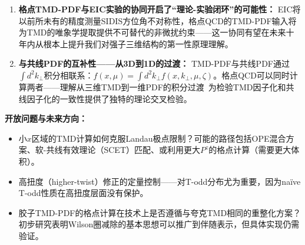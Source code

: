 \documentclass[12pt,a4paper]{ctexart}
\theoremstyle{definition}
\begin{document}
\begin{enumerate}[leftmargin=*]
    \item \textbf{格点TMD-PDF与EIC实验的协同开启了``理论-实验闭环''的可能性：}
    EIC将以前所未有的精度测量SIDIS方位角不对称性，格点QCD的TMD-PDF输入将为TMD的唯象学提取提供不可替代的非微扰约束——这一协同有望在未来十年内从根本上提升我们对强子三维结构的第一性原理理解。

    \item \textbf{与共线PDF的互补性——从3D到1D的过渡：}
    TMD-PDF与共线PDF通过$\int d^2 k_\perp$积分相联系：$f(x, \mu) = \int d^2 k_\perp f(x, k_\perp, \mu, \zeta)$。格点QCD可以同时计算两者——理解从三维TMD到一维PDF的积分过渡~\cite{He2024unpolTMD}为检验TMD因子化和共线因子化的一致性提供了独特的理论交叉检验。

\end{enumerate}

\textbf{开放问题与未来方向：}
\begin{itemize}
    \item 小$x$区域的TMD计算如何克服Landau极点限制？可能的路径包括OPE混合方案、软-共线有效理论（SCET）匹配、或利用更大$P^z$的格点计算（需要更大体积）。
    \item 高扭度（higher-twist）修正的定量控制——对T-odd分布尤为重要，因为na\"ive T-odd性质在高扭度层面没有保护。
    \item 胶子TMD-PDF的格点计算在技术上是否遵循与夸克TMD相同的重整化方案？初步研究表明Wilson圈减除的基本思想可以推广到伴随表示，但具体实现仍需验证。
\end{itemize}
\end{document}
